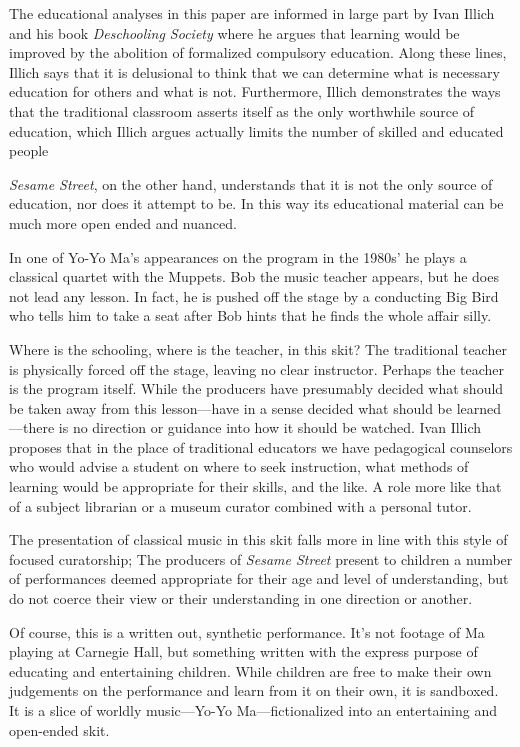 \documentclass[12pt,letterpaper]{article}
\begin{document}
	The educational analyses in this paper are informed in large part by 
	Ivan Illich and his book \textit{Deschooling Society} where he argues
	that learning would be improved by the abolition of formalized
	compulsory education. Along these lines, Illich says that it is 
	delusional to think that we can determine what is necessary education 
	for others and what is not.\autocite[12]{Illich} Furthermore, Illich 
	demonstrates the ways that the traditional classroom asserts itself as
	the only worthwhile source of education, which Illich argues actually 
	limits the number of skilled and educated people\autocite[39]{Illich} 
		
	\textit{Sesame Street}, on the other hand, understands that it is not 
	the only source of education, nor does it attempt to be. In this way its
	educational material can be much more open ended and nuanced. 

	In one of Yo-Yo Ma's appearances on the program in the 1980s' he plays
	a classical quartet with the Muppets. Bob the music teacher appears, 
	but he does not lead any lesson. In fact, he is pushed off the stage by 
	a conducting Big Bird who tells him to take a seat after Bob hints that
	he finds the whole affair silly.

	Where is the schooling, where is the teacher, in this skit? The 
	traditional teacher is physically forced off the stage, leaving no clear
	instructor.  Perhaps the teacher is the program itself.  While the 
	producers have presumably decided what should be taken away from this 
	lesson---have in a sense decided what should be learned---there is no 
	direction or guidance into how it should be watched. Ivan Illich
	proposes that in the place of traditional educators we have
	pedagogical counselors who would advise a student on where to seek 
	instruction, what methods of learning would be appropriate for their 
	skills, and the like. A role more like that of a subject librarian or a 
	museum curator combined with a personal tutor.\autocite[43]{Illich}

	The presentation of classical music in this skit falls more in line with
	this style of focused curatorship; The producers of \textit{Sesame 
	Street} present to children a number of performances deemed appropriate
	for their age and level of understanding, but do not coerce their view 
	or their understanding in one direction or another.


	Of course, this is a written out, synthetic performance. It's not 
	footage of Ma playing at Carnegie Hall, but something written with the 
	express purpose of educating and entertaining children. While children 
	are free to make their own judgements on the performance and learn from
	it on their own, it is sandboxed. It is a slice of worldly music---Yo-Yo
	Ma---fictionalized into an entertaining and open-ended skit. 
\end{document}
